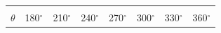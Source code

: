\begin{center}
\begin{xtabular*}{\mytablewidth}[t]{|p{10\mystarwidth}|p{10\mystarwidth}|p{10\mystarwidth}|p{10\mystarwidth}|p{10\mystarwidth}|p{10\mystarwidth}|p{10\mystarwidth}|p{10\mystarwidth}|}
&
&
&
&
\tabularnewline{}
    $\theta $
    &
180${}^{\circ }$ &
210${}^{\circ }$ &
240${}^{\circ }$ &
270${}^{\circ }$ &
300${}^{\circ }$ &
330${}^{\circ }$ &
360${}^{\circ }$%
\tabularnewline{}

\end{xtabular*}
\end{center}
